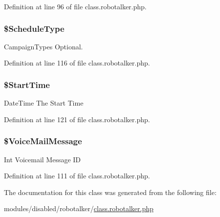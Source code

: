 Definition at line 96 of file class.\-robotalker.\-php.

\hypertarget{class_schedule_calls_request_of_int32_ad8484f456a9bd6b83b5f077db37b7558}{
\subsubsection[{\$\-Schedule\-Type}]{\setlength{\rightskip}{0pt plus 5cm}\$Schedule\-Type}}\label{class_schedule_calls_request_of_int32_ad8484f456a9bd6b83b5f077db37b7558}
Campaign\-Types Optional. 

Definition at line 116 of file class.\-robotalker.\-php.

\hypertarget{class_schedule_calls_request_of_int32_a2f8fa05008bd8e80ae9cb79699e0ed2c}{
\subsubsection[{\$\-Start\-Time}]{\setlength{\rightskip}{0pt plus 5cm}\$Start\-Time}}\label{class_schedule_calls_request_of_int32_a2f8fa05008bd8e80ae9cb79699e0ed2c}
Date\-Time The Start Time 

Definition at line 121 of file class.\-robotalker.\-php.

\hypertarget{class_schedule_calls_request_of_int32_ab8946a1492b48b7d64a4e6f298903f74}{
\subsubsection[{\$\-Voice\-Mail\-Message}]{\setlength{\rightskip}{0pt plus 5cm}\$Voice\-Mail\-Message}}\label{class_schedule_calls_request_of_int32_ab8946a1492b48b7d64a4e6f298903f74}
Int Voicemail Message I\-D 

Definition at line 111 of file class.\-robotalker.\-php.



The documentation for this class was generated from the following file\-:\begin{DoxyCompactItemize}
\item 
modules/disabled/robotalker/\hyperlink{class_8robotalker_8php}{class.\-robotalker.\-php}\end{DoxyCompactItemize}
